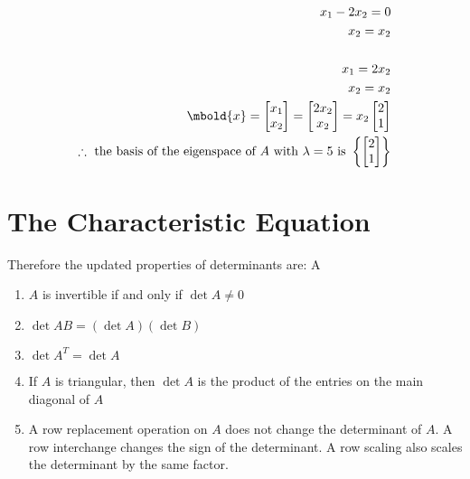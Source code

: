 \documentclass[12pt letter]{report}
\begin{document}
{\begin{align*}
    \\
    x_1 -2x_2 = 0                                                                               \\
    x_2  = x_2                                                                                  \\
    \\
    x_1 = 2x_2                                                                                  \\
    x_2 = x_2                                                                                   \\
    \mbold{x} = \begin{bmatrix} x_1 \\ x_2 \end{bmatrix} = \begin{bmatrix} 2x_2 \\ x_2 \end{bmatrix}  = x_2
    \begin{bmatrix} 2 \\ 1 \end{bmatrix}                                                        \\
    \therefore \text{ the basis of the eigenspace of $A$ with $\lambda = 5$ is } \left\{ \begin{bmatrix} 2 \\ 1 \end{bmatrix}  \right\}
  \end{align*}
}

\chapter{The Characteristic Equation}


Therefore the updated properties of determinants are:
\thm{}A{
\begin{enumerate}
  \item $A$ is invertible if and only if $\det A \neq 0$
  \item $\det AB = \left( \det A \right) \left( \det B \right)  $
  \item $\det A^{T} = \det A$
  \item If $A$ is triangular, then $\det A$ is the product of the entries on the main diagonal of $A$
  \item A row replacement operation on $A$ does not change the determinant of $A$. A row interchange changes the
        sign of the determinant. A row scaling also scales the determinant by the same factor.
\end{enumerate}
}
\end{document}
